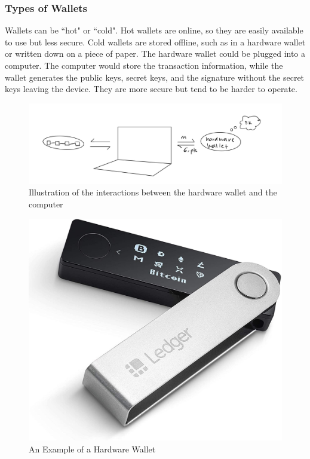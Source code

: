 \subsubsection{Types of Wallets}
Wallets can be ``hot" or ``cold". Hot wallets are online, so they are easily available to use but less secure. Cold wallets are stored offline, such as in a hardware wallet or written down on a piece of paper. The hardware wallet could be plugged into a computer. The computer would store the transaction information, while the wallet generates the public keys, secret keys, and the signature without the secret keys leaving the device. They are more secure but tend to be harder to operate.


\begin{figure}[ht]
    \centering
    \includegraphics[scale = 0.5]{figures/hardware.png}
    \caption{Illustration of the interactions between the hardware wallet and the computer}
    \label{fig:hardware}
\end{figure}

\begin{figure}[ht]
    \centering
    \includegraphics[scale = 0.1]{figures/hardware_wallet.jpg}
    \caption{An Example of a Hardware Wallet\cite{hard}}
    \label{fig:hardware_wallet}
\end{figure}


